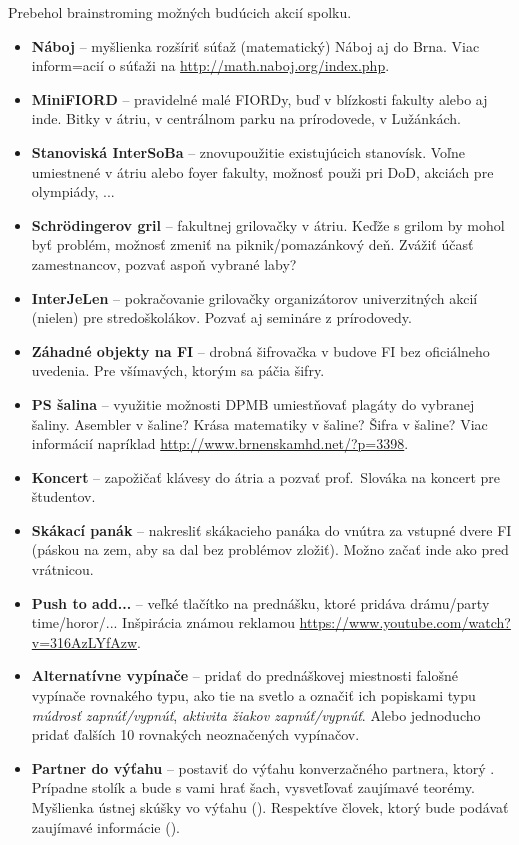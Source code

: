 \documentclass[11pt,a4paper]{article}
\begin{document}
Prebehol brainstroming možných budúcich akcií spolku.
\begin{itemize}[itemsep=0pt]
\item \textbf{Náboj} -- myšlienka rozšíriť súťaž (matematický) Náboj aj do Brna. Viac inform=acií o súťaži na \url{http://math.naboj.org/index.php}.
\item \textbf{MiniFIORD} -- pravidelné malé FIORDy, buď v blízkosti fakulty alebo aj inde. Bitky v átriu, v centrálnom parku na prírodovede, v Lužánkách.
\item \textbf{Stanoviská InterSoBa} -- znovupoužitie existujúcich stanovísk. Voľne umiestnené v átriu alebo foyer fakulty, možnosť použi pri DoD, akciách pre olympiády, ...
\item \textbf{Schrödingerov gril} --  fakultnej grilovačky v átriu. Keďže s grilom by mohol byť problém, možnosť zmeniť na piknik/pomazánkový deň. Zvážiť účasť zamestnancov, pozvať aspoň vybrané laby?
\item \textbf{InterJeLen} -- pokračovanie grilovačky organizátorov univerzitných akcií (nielen) pre stredoškolákov. Pozvať aj semináre z prírodovedy.
\item \textbf{Záhadné objekty na FI} -- drobná šifrovačka v budove FI bez oficiálneho uvedenia. Pre všímavých, ktorým sa páčia šifry.
\item \textbf{PS šalina} -- využitie možnosti DPMB umiestňovať plagáty do vybranej šaliny. Asembler v šaline? Krása matematiky v šaline? Šifra v šaline? Viac informácií napríklad \url{http://www.brnenskamhd.net/?p=3398}.
\item \textbf{Koncert} -- zapožičať klávesy do átria a pozvať prof.\ Slováka na koncert pre študentov.
\item \textbf{Skákací panák} -- nakresliť skákacieho panáka do vnútra za vstupné dvere FI (páskou na zem, aby sa dal bez problémov zložiť). Možno začať inde ako pred vrátnicou.
\item \textbf{Push to add...} -- veľké tlačítko na prednášku, ktoré pridáva drámu/party time/horor/... Inšpirácia známou reklamou \url{https://www.youtube.com/watch?v=316AzLYfAzw}.
\item \textbf{Alternatívne vypínače} -- pridať do prednáškovej miestnosti falošné vypínače rovnakého typu, ako tie na svetlo a označiť ich popiskami typu \textit{múdrosť zapnúť/vypnúť}, \textit{aktivita žiakov zapnúť/vypnúť}. Alebo jednoducho pridať ďalších 10 rovnakých neoznačených vypínačov.
\item \textbf{Partner do výťahu} -- postaviť do výťahu konverzačného partnera, ktorý . Prípadne stolík a bude s vami hrať šach, vysvetľovať zaujímavé teorémy. Myšlienka ústnej skúšky vo výťahu (). Respektíve človek, ktorý bude podávať zaujímavé informácie ().
\end{itemize}
\end{document}
